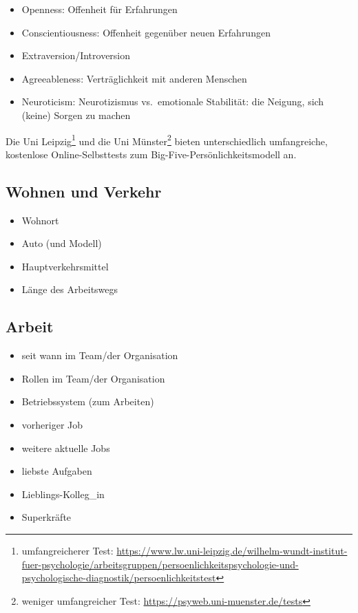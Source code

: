 \begin{itemize}
  \item {} Openness: Offenheit für Erfahrungen
  \item {} Conscientiousness: Offenheit gegenüber neuen Erfahrungen
  \item {} Extraversion/Introversion
  \item {} Agreeableness: Verträglichkeit mit anderen Menschen
  \item {} Neuroticism: Neurotizismus vs.~emotionale Stabilität: die Neigung, sich (keine) Sorgen zu machen
\end{itemize}

Die Uni Leipzig\footnote{umfangreicherer Test: \url{https://www.lw.uni-leipzig.de/wilhelm-wundt-institut-fuer-psychologie/arbeitsgruppen/persoenlichkeitspsychologie-und-psychologische-diagnostik/persoenlichkeitstest}} und die Uni Münster\footnote{weniger umfangreicher Test: \url{https://psyweb.uni-muenster.de/tests}} bieten unterschiedlich umfangreiche, kostenlose Online-Selbsttests zum Big-Five-Persönlichkeitsmodell an.


\subsection{Wohnen und Verkehr}

\begin{multicols}{2}
  \begin{itemize}
    \item Wohnort
    \item Auto (und Modell)
    \item Hauptverkehrsmittel
    \item Länge des Arbeitswegs
  \end{itemize}
\end{multicols}


\subsection{Arbeit}

\begin{multicols}{2}
  \begin{itemize}
    \item seit wann im Team/der Organisation
    \item Rollen im Team/der Organisation
    \item Betriebssystem (zum Arbeiten)
    \item vorheriger Job
    \item weitere aktuelle Jobs
    \item liebste Aufgaben
    \item Lieblings-Kolleg\_in
    \item Superkräfte
  \end{itemize}
\end{multicols}


